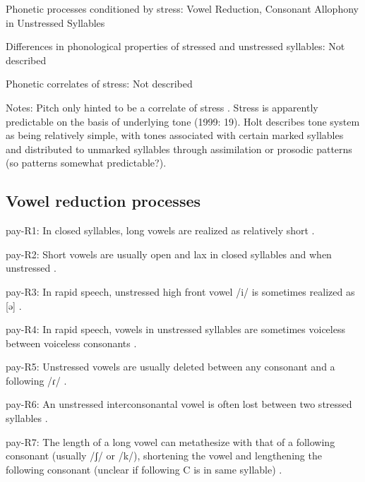 {\begin{appendixdesc}
\item[Phonetic processes conditioned by stress:] Vowel Reduction, Consonant Allophony in Unstressed Syllables

\item[Differences in phonological properties of stressed and unstressed syllables:] Not described

\item[Phonetic correlates of stress:] Not described

\item[Notes:] Pitch only hinted to be a correlate of stress \citep[238]{Holt1986}. Stress is apparently predictable on the basis of underlying tone (1999: 19). Holt describes tone system as being relatively simple, with tones associated with certain marked syllables and distributed to unmarked syllables through assimilation or prosodic patterns (so patterns somewhat predictable?).
\end{appendixdesc}
\subsection*{Vowel reduction processes}
\begin{appendixdesc}

\item[pay-R1:] In closed syllables, long vowels are realized as relatively short \citep[18]{Holt1999}.

\item[pay-R2:] Short vowels are usually open and lax in closed syllables and when unstressed \citep[18]{Holt1999}.

\item[pay-R3:] In rapid speech, unstressed high front vowel /i/ is sometimes realized as [ə] \citep[18]{Holt1999}.

\item[pay-R4:] In rapid speech, vowels in unstressed syllables are sometimes voiceless between voiceless consonants \citep[18]{Holt1999}.

\item[pay-R5:] Unstressed vowels are usually deleted between any consonant and a following /ɾ/ \citep[23]{Holt1999}.

\item[pay-R6:] An unstressed interconsonantal vowel is often lost between two stressed syllables \citep[23]{Holt1999}.

\item[pay-R7:] The length of a long vowel can metathesize with that of a following consonant (usually /ʃ/ or /k/), shortening the vowel and lengthening the following consonant (unclear if following C is in same syllable) \citep[24--25]{Holt1999}.
\end{appendixdesc}
}
